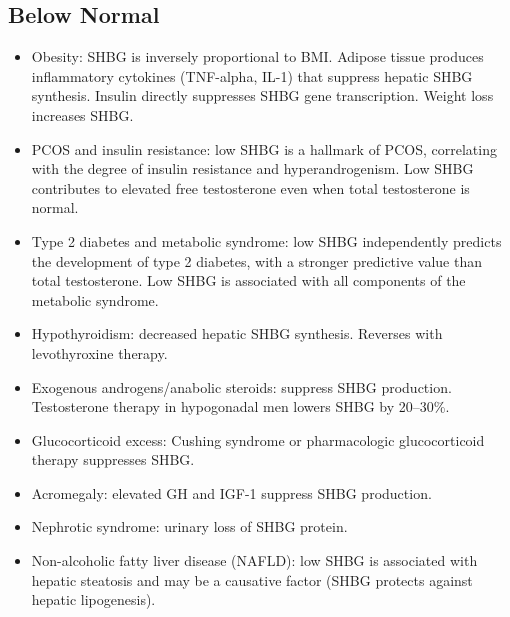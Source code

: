 \subsection*{Below Normal}
\begin{itemize}
  \item Obesity: SHBG is inversely proportional to BMI. Adipose tissue produces inflammatory cytokines (TNF-alpha, IL-1) that suppress hepatic SHBG synthesis. Insulin directly suppresses SHBG gene transcription. Weight loss increases SHBG.
  \item PCOS and insulin resistance: low SHBG is a hallmark of PCOS, correlating with the degree of insulin resistance and hyperandrogenism. Low SHBG contributes to elevated free testosterone even when total testosterone is normal.
  \item Type 2 diabetes and metabolic syndrome: low SHBG independently predicts the development of type 2 diabetes, with a stronger predictive value than total testosterone. Low SHBG is associated with all components of the metabolic syndrome.
  \item Hypothyroidism: decreased hepatic SHBG synthesis. Reverses with levothyroxine therapy.
  \item Exogenous androgens/anabolic steroids: suppress SHBG production. Testosterone therapy in hypogonadal men lowers SHBG by 20--30\%.
  \item Glucocorticoid excess: Cushing syndrome or pharmacologic glucocorticoid therapy suppresses SHBG.
  \item Acromegaly: elevated GH and IGF-1 suppress SHBG production.
  \item Nephrotic syndrome: urinary loss of SHBG protein.
  \item Non-alcoholic fatty liver disease (NAFLD): low SHBG is associated with hepatic steatosis and may be a causative factor (SHBG protects against hepatic lipogenesis).
\end{itemize}

